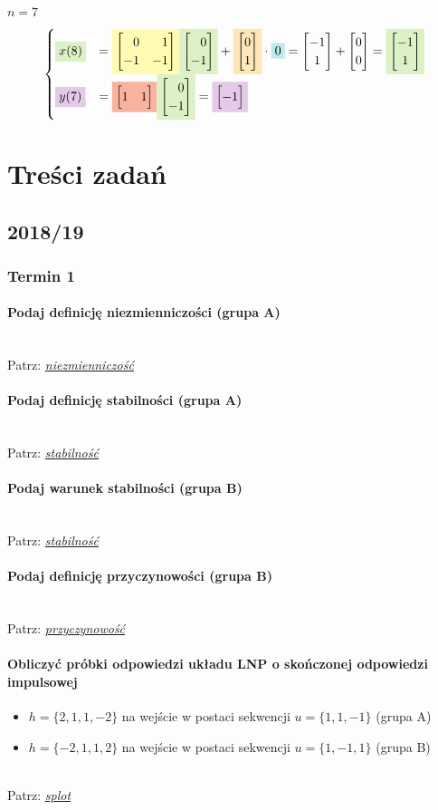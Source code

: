 \documentclass[12pt]{scrartcl}
\newcommand{\myparagraph}[1]{\paragraph{#1}\mbox{}\\}
\newcommand{\macierz}[1]{\begin{bmatrix}#1\end{bmatrix}}
\newcommand{\bgcolor}[2]{\colorbox{#1!30}{#2}}
\newcommand{\rownaniezmacierzax}[5]{
	\bgcolor{YellowGreen}{#1} &= \bgcolor{Yellow}{#2}\bgcolor{YellowGreen}{#3} + \bgcolor{Dandelion}{#4}\cdot\bgcolor{Turquoise}{#5}
}
\newcommand{\rownaniezmacierzaysimple}[3]{
	\bgcolor{Orchid}{#1} &= \bgcolor{Red}{#2}\bgcolor{YellowGreen}{#3}
}
\newcommand{\m}{\phantom{-}}
\begin{document}
$n=7$\\
$$
\begin{cases}
\rownaniezmacierzax{$x(8)$}
{$\vA$}							%
{$\macierz{\m0 \\ -1}$}			%
{$\macierz{0 \\ 1}$}			%
{0}								%
=\macierz{-1 \\ 1} + \macierz{0 \\ 0}
=\bgcolor{YellowGreen}{$\macierz{-1 \\ 1}$}\\

\rownaniezmacierzaysimple{$y(7)$}
{$\macierz{1 & 1}$}				%
{$\macierz{\m0 \\ -1}$}			%
= \bgcolor{Orchid}{$\macierz{-1}$}
\end{cases}
$$


\section{Treści zadań}
\subsection{2018/19}
\subsubsection{Termin 1}

\myparagraph{Podaj definicję niezmienniczości (grupa A)}
Patrz: \hyperref[sec:niezmienniczosc]{\textit{\underline{niezmienniczość}}}

\myparagraph{Podaj definicję stabilności (grupa A)}
Patrz: \hyperref[sec:stabilnosc]{\textit{\underline{stabilność}}}

\myparagraph{Podaj warunek stabilności (grupa B)}
Patrz: \hyperref[sec:przyczynowosc]{\textit{\underline{stabilność}}}

\myparagraph{Podaj definicję przyczynowości (grupa B)}
Patrz: \hyperref[sec:przyczynowosc]{\textit{\underline{przyczynowość}}}

\paragraph{Obliczyć próbki odpowiedzi układu LNP o skończonej odpowiedzi impulsowej}
\begin{itemize}[noitemsep,topsep=0pt]
		\item[a)] $h=\{2, 1, 1, -2\}$ na wejście w postaci sekwencji $u=\{1, 1, -1\}$ (grupa A)
		\item[b)] $h=\{-2, 1, 1, 2\}$ na wejście w postaci sekwencji $u=\{1, -1, 1\}$ (grupa B)
\end{itemize}
$ $\\
Patrz: \hyperref[sec:splot]{\textit{\underline{splot}}}
\end{document}
